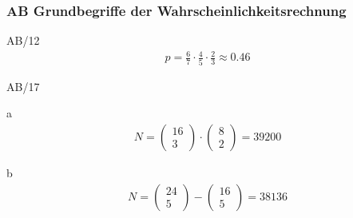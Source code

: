 \subsubsection{AB Grundbegriffe der Wahrscheinlichkeitsrechnung}
\begin{exercise}{AB/12}
  \begin{gather*}
    p = \frac{6}{7} \cdot \frac{4}{5} \cdot \frac{2}{3} \approx 0.46
  \end{gather*}
\end{exercise}
\begin{exercise}{AB/17}
  \item [a]
  \begin{gather*}
    N = \begin{pmatrix}16 \\ 3\end{pmatrix} \cdot \begin{pmatrix}8 \\ 2\end{pmatrix} = 39200
  \end{gather*}
  \item [b]
  \begin{gather*}
    N = \begin{pmatrix}24 \\ 5\end{pmatrix} - \begin{pmatrix}16 \\ 5\end{pmatrix} = 38136
  \end{gather*}
\end{exercise}
